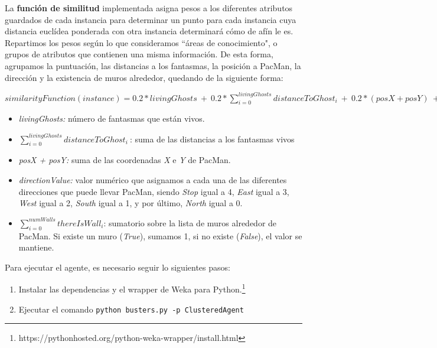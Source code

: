 \documentclass[12pt]{article}
\begin{document}

La \textbf{función de similitud} implementada asigna pesos a los diferentes atributos guardados de cada instancia para determinar un punto para cada instancia cuya distancia euclídea ponderada con otra instancia determinará cómo de afín le es. Repartimos los pesos según lo que consideramos ``áreas de conocimiento", o grupos de atributos que contienen una misma información. De esta forma, agrupamos la puntuación, las distancias a los fantasmas, la posición a PacMan, la dirección y la existencia de muros alrededor, quedando de la siguiente forma:
\begin{center}
    $ similarityFunction(instance) = 0.2 * livingGhosts\ +\ 0.2 * \sum\limits_{i = 0}^{livingGhosts} distanceToGhost_i\ +\ 0.2 *  (posX + posY)\ +\ 0.2 * directionValue\ +\ 0.2 * \sum\limits_{i = 0}^{numWalls} thereIsWall_i $
\end{center}

\begin{itemize}
    \item \textit{livingGhosts: } número de fantasmas que están vivos.
    \item $ \sum\limits_{i = 0}^{livingGhosts} distanceToGhost_i\ $: suma de las distancias a los fantasmas vivos
    \item \textit{posX + posY: } suma de las coordenadas \textit{X} e \textit{Y} de PacMan.
    \item \textit{directionValue: } valor numérico que asignamos a cada una de las diferentes direcciones que puede llevar PacMan, siendo \textit{Stop} igual a 4, \textit{East} igual a 3, \textit{West} igual a 2, \textit{South} igual a 1, y por último, \textit{North} igual a 0.
    \item $ \sum\limits_{i = 0}^{numWalls} thereIsWall_i $: sumatorio sobre la lista de muros alrededor de PacMan. Si existe un muro (\textit{True}), sumamos 1, si no existe (\textit{False}), el valor se mantiene.
\end{itemize}

Para ejecutar el agente, es necesario seguir lo siguientes pasos:
\begin{enumerate}
    \item Instalar las dependencias y el wrapper de Weka para Python.\footnote{https://pythonhosted.org/python-weka-wrapper/install.html}
    \item Ejecutar el comando \texttt{python busters.py -p ClusteredAgent}
\end{enumerate}
\end{document}
